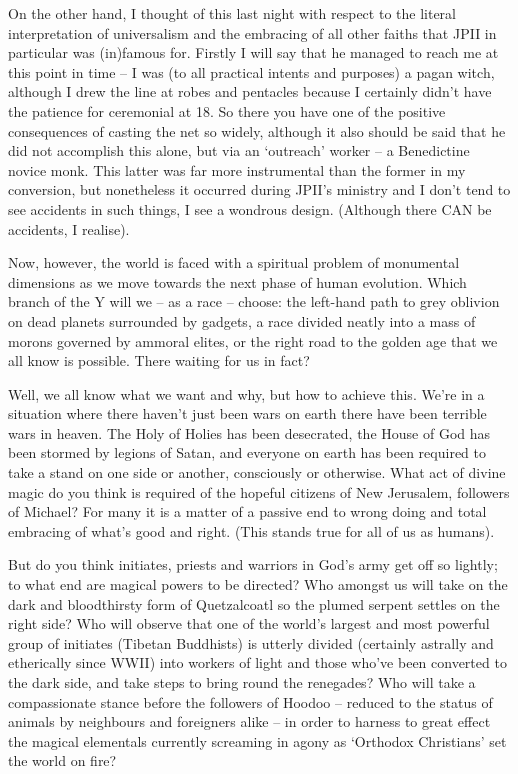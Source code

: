 \begin{footnotesize}
\begin{sffamily}
On the other hand, I thought of this last night with respect to the literal interpretation of universalism and the embracing of all other faiths that JPII in particular was (in)famous for. Firstly I will say that he managed to reach me at this point in time -- I was (to all practical intents and purposes) a pagan witch, although I drew the line at robes and pentacles because I certainly didn't have the patience for ceremonial at 18. So there you have one of the positive consequences of casting the net so widely, although it also should be said that he did not accomplish this alone, but via an `outreach' worker -- a Benedictine novice monk. This latter was far more instrumental than the former in my conversion, but nonetheless it occurred during JPII's ministry and I don't tend to see accidents in such things, I see a wondrous design. (Although there CAN be accidents, I realise).

Now, however, the world is faced with a spiritual problem of monumental dimensions as we move towards the next phase of human evolution. Which branch of the Y will we -- as a race -- choose: the left-hand path to grey oblivion on dead planets surrounded by gadgets, a race divided neatly into a mass of morons governed by ammoral elites, or the right road to the golden age that we all know is possible. There waiting for us in fact?

Well, we all know what we want and why, but how to achieve this. We're in a situation where there haven't just been wars on earth there have been terrible wars in heaven. The Holy of Holies has been desecrated, the House of God has been stormed by legions of Satan, and everyone on earth has been required to take a stand on one side or another, consciously or otherwise. What act of divine magic do you think is required of the hopeful citizens of New Jerusalem, followers of Michael? For many it is a matter of a passive end to wrong doing and total embracing of what's good and right. (This stands true for all of us as humans).

But do you think initiates, priests and warriors in God's army get off so lightly; to what end are magical powers to be directed? Who amongst us will take on the dark and bloodthirsty form of Quetzalcoatl so the plumed serpent settles on the right side? Who will observe that one of the world's largest and most powerful group of initiates (Tibetan Buddhists) is utterly divided (certainly astrally and etherically since WWII) into workers of light and those who've been converted to the dark side, and take steps to bring round the renegades? Who will take a compassionate stance before the followers of Hoodoo -- reduced to the status of animals by neighbours and foreigners alike -- in order to harness to great effect the magical elementals currently screaming in agony as `Orthodox Christians' set the world on fire?


\end{sffamily}
\end{footnotesize}
